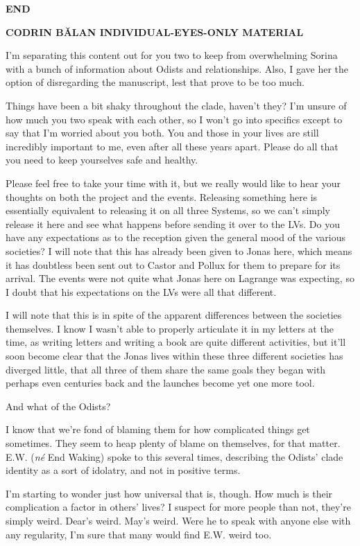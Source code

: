 \textbf{END}

\textbf{CODRIN BĂLAN INDIVIDUAL-EYES-ONLY MATERIAL}

I'm separating this content out for you two to keep from overwhelming Sorina with a bunch of information about Odists and relationships. Also, I gave her the option of disregarding the manuscript, lest that prove to be too much.

Things have been a bit shaky throughout the clade, haven't they? I'm unsure of how much you two speak with each other, so I won't go into specifics except to say that I'm worried about you both. You and those in your lives are still incredibly important to me, even after all these years apart. Please do all that you need to keep yourselves safe and healthy.

Please feel free to take your time with it, but we really would like to hear your thoughts on both the project and the events. Releasing something here is essentially equivalent to releasing it on all three Systems, so we can't simply release it here and see what happens before sending it over to the LVs. Do you have any expectations as to the reception given the general mood of the various societies? I will note that this has already been given to Jonas here, which means it has doubtless been sent out to Castor and Pollux for them to prepare for its arrival. The events were not quite what Jonas here on Lagrange was expecting, so I doubt that his expectations on the LVs were all that different.

I will note that this is in spite of the apparent differences between the societies themselves. I know I wasn't able to properly articulate it in my letters at the time, as writing letters and writing a book are quite different activities, but it'll soon become clear that the Jonas lives within these three different societies has diverged little, that all three of them share the same goals they began with perhaps even centuries back and the launches become yet one more tool.

And what of the Odists?

I know that we're fond of blaming them for how complicated things get sometimes. They seem to heap plenty of blame on themselves, for that matter. E.W. (\emph{né} End Waking) spoke to this several times, describing the Odists' clade identity as a sort of idolatry, and not in positive terms.

I'm starting to wonder just how universal that is, though. How much is their complication a factor in others' lives? I suspect for more people than not, they're simply weird. Dear's weird. May's weird. Were he to speak with anyone else with any regularity, I'm sure that many would find E.W. weird too.

